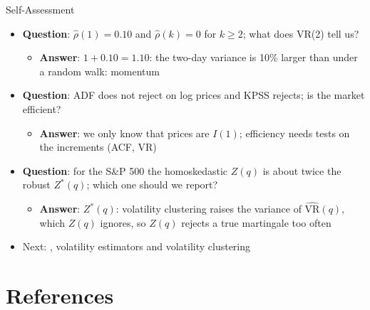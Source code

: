 \begin{frame}{Self-Assessment}
\itemsize{\small}
\begin{itemize}
    \item \textbf{Question}: $\hat\rho(1) = 0.10$ and $\hat\rho(k) = 0$ for $k \ge 2$; what does VR(2) tell us?
    \begin{itemize}
        \item \textbf{Answer}: $1 + 0.10 = 1.10$: the two-day variance is 10\% larger than under a random walk: momentum
    \end{itemize}
    \item \textbf{Question}: ADF does not reject on log prices and KPSS rejects; is the market efficient?
    \begin{itemize}
        \item \textbf{Answer}: we only know that prices are $I(1)$; efficiency needs tests on the increments (ACF, VR)
    \end{itemize}
    \item \textbf{Question}: for the S\&P 500 the homoskedastic $Z(q)$ is about twice the robust $Z^*(q)$; which one should we report?
    \begin{itemize}
        \item \textbf{Answer}: $Z^*(q)$: volatility clustering raises the variance of $\widehat{\mathrm{VR}}(q)$, which $Z(q)$ ignores, so $Z(q)$ rejects a true martingale too often
    \end{itemize}
    \item Next: , volatility estimators and volatility clustering
\end{itemize}
\end{frame}


\section{References}

